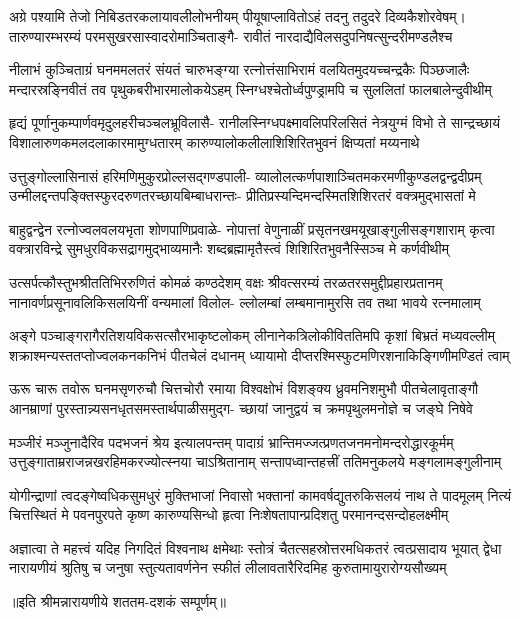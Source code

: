 

\fourlineindentedshloka
{अग्रे पश्यामि तेजो निबिडतरकलायावलीलोभनीयम्}
{पीयूषाप्लावितोऽहं तदनु तदुदरे दिव्यकैशोरवेषम्।}
{तारुण्यारम्भरम्यं परमसुखरसास्वादरोमाञ्चिताङ्गै-}
{रावीतं नारदाद्यैविलसदुपनिषत्सुन्दरीमण्डलैश्च}

\fourlineindentedshloka
{नीलाभं कुञ्चिताग्रं घनममलतरं संयतं चारुभङ्ग्या}
{रत्नोत्तंसाभिरामं वलयितमुदयच्चन्द्रकैः पिञ्छजालैः}
{मन्दारस्रङ्निवीतं तव पृथुकबरीभारमालोकयेऽहम्}
{स्निग्धश्चेतोर्ध्वपुण्ड्रामपि च सुललितां फालबालेन्दुवीथीम्}

\fourlineindentedshloka
{हृद्यं पूर्णानुकम्पार्णवमृदुलहरीचञ्चलभ्रूविलासै-}
{रानीलस्निग्धपक्ष्मावलिपरिलसितं नेत्रयुग्मं विभो ते}
{सान्द्रच्छायं विशालारुणकमलदलाकारमामुग्धतारम्}
{कारुण्यालोकलीलाशिशिरितभुवनं क्षिप्यतां मय्यनाथे}

\fourlineindentedshloka
{उत्तुङ्गोल्लासिनासं हरिमणिमुकुरप्रोल्लसद्गण्डपाली-}
{व्यालोलत्कर्णपाशाञ्चितमकरमणीकुण्डलद्वन्द्वदीप्रम्}
{उन्मीलद्दन्तपङ्क्तिस्फुरदरुणतरच्छायबिम्बाधरान्तः-}
{प्रीतिप्रस्यन्दिमन्दस्मितशिशिरतरं वक्त्रमुद्भासतां मे}

\fourlineindentedshloka
{बाहुद्वन्द्वेन रत्नोज्वलवलयभृता शोणपाणिप्रवाळे-}
{नोपात्तां वेणुनाळीं प्रसृतनखमयूखाङ्गुलीसङ्गशाराम्}
{कृत्वा वक्त्रारविन्द्रे सुमधुरविकसद्रागमुद्भाव्यमानैः}
{शब्दब्रह्मामृतैस्त्वं शिशिरितभुवनैस्सिञ्च मे कर्णवीथीम्}

\fourlineindentedshloka
{उत्सर्पत्कौस्तुभश्रीततिभिररुणितं कोमळं कण्ठदेशम्}
{वक्षः श्रीवत्सरम्यं तरळतरसमुद्दीप्रहारप्रतानम्}
{नानावर्णप्रसूनावलिकिसलयिनीं वन्यमालां विलोल-}
{ल्लोलम्बां लम्बमानामुरसि तव तथा भावये रत्नमालाम्}

\fourlineindentedshloka
{अङ्गे पञ्चाङ्गरागैरतिशयविकसत्सौरभाकृष्टलोकम्}
{लीनानेकत्रिलोकीविततिमपि कृशां बिभ्रतं मध्यवल्लीम्}
{शक्राश्मन्यस्ततप्तोज्वलकनकनिभं पीतचेलं दधानम्}
{ध्यायामो दीप्तरश्मिस्फुटमणिरशनाकिङ्गिणीमण्डितं त्वाम्}

\fourlineindentedshloka
{ऊरू चारू तवोरू घनमसृणरुचौ चित्तचोरौ रमाया}
{विश्वक्षोभं विशङ्क्य ध्रुवमनिशमुभौ पीतचेलावृताङ्गौ}
{आनम्राणां पुरस्तान्न्यसनधृतसमस्तार्थपाळीसमुद्ग-}
{च्छायां जानुद्वयं च क्रमपृथुलमनोज्ञे च जङ्घे निषेवे}

\fourlineindentedshloka
{मञ्जीरं मञ्जुनादैरिव पदभजनं श्रेय इत्यालपन्तम्}
{पादाग्रं भ्रान्तिमज्जत्प्रणतजनमनोमन्दरोद्धारकूर्मम्}
{उत्तुङ्गाताम्रराजन्नखरहिमकरज्योत्स्नया चाऽश्रितानाम्}
{सन्तापध्वान्तहत्त्रीं ततिमनुकलये मङ्गलामङ्गुलीनाम्}

\fourlineindentedshloka
{योगीन्द्राणां त्वदङ्गेष्वधिकसुमधुरं मुक्तिभाजां निवासो}
{भक्तानां कामवर्षद्युतरुकिसलयं नाथ ते पादमूलम्}
{नित्यं चित्तस्थितं मे पवनपुरपते कृष्ण कारुण्यसिन्धो}
{हृत्वा निःशेषतापान्प्रदिशतु परमानन्दसन्दोहलक्ष्मीम्}

\fourlineindentedshloka
{अज्ञात्वा ते महत्त्वं यदिह निगदितं विश्वनाथ क्षमेथाः}
{स्तोत्रं चैतत्सहस्रोत्तरमधिकतरं त्वत्प्रसादाय भूयात्}
{द्वेधा नारायणीयं श्रुतिषु च जनुषा स्तुत्यतावर्णनेन}
{स्फीतं लीलावतारैरिदमिह कुरुतामायुरारोग्यसौख्यम्}

{॥इति श्रीमन्नारायणीये शततम-दशकं सम्पूर्णम्॥}

